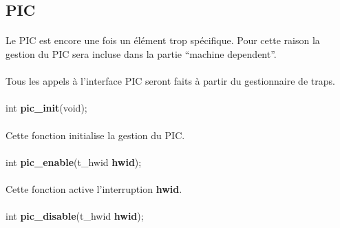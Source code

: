 \documentclass[10pt,a4wide]{article}
\begin{document}
\subsection{PIC}

\paragraph{}

Le PIC est encore une fois un \'el\'ement trop sp\'ecifique. Pour cette
raison la gestion du PIC sera incluse dans la partie ``machine dependent''.

\paragraph{}

Tous les appels \`a l'interface PIC seront faits \`a partir du gestionnaire
de traps.

\paragraph{}

\hspace{1.5cm}int \textbf{pic\_init}(void);

\paragraph{}

Cette fonction initialise la gestion du PIC.

\paragraph{}

\hspace{1.5cm}int \textbf{pic\_enable}(t\_hwid \textbf{hwid});

\paragraph{}

Cette fonction active l'interruption \textbf{hwid}.

\paragraph{}

\hspace{1.5cm}int \textbf{pic\_disable}(t\_hwid \textbf{hwid});
\end{document}
